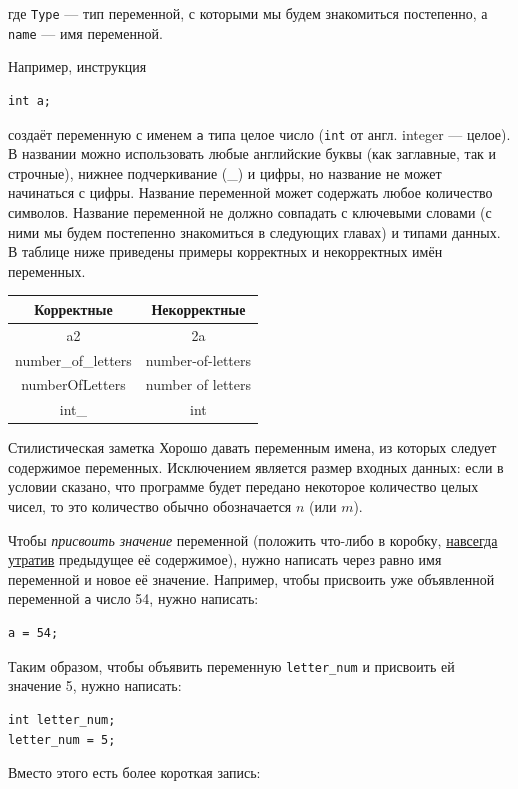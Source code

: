 \documentclass{article}
\newcommand{\tabularII}[1]{\begin{center}\begin{tabular}{|c|c|} #1 \end{tabular}\end{center}}
\newcommand{\style}[1]{
	\begin{sectionenv}[green!30!white]{Стилистическая заметка}
		#1
	\end{sectionenv}
}
\begin{document}
	где \texttt{Type} --- тип переменной, с которыми мы будем знакомиться постепенно, а \texttt{name} --- имя переменной.
	
	Например, инструкция
	
	\begin{lstlisting}
int a;
	\end{lstlisting}
	
	создаёт переменную с именем \texttt{a} типа целое число (\texttt{int} от англ. integer --- целое). В названии можно использовать любые английские буквы (как заглавные, так и строчные), нижнее подчеркивание (\_) и цифры, но название не может начинаться с цифры. Название переменной может содержать любое количество символов. Название переменной не должно совпадать с ключевыми словами (с ними мы будем постепенно знакомиться в следующих главах) и типами данных. В таблице ниже приведены примеры корректных и некорректных имён переменных.
	
	\tabularII{
		\hline
		\textbf{Корректные} & \textbf{Некорректные}\\
		\hline
		a2 & 2a\\
		\hline
		number\_of\_letters & number-of-letters\\
		\hline
		numberOfLetters & number of letters\\
		\hline
		int\_ & int\\
		\hline
	}
	
	\style{Хорошо давать переменным имена, из которых следует содержимое переменных. Исключением является размер входных данных: если в условии сказано, что программе будет передано некоторое количество целых чисел, то это количество обычно обозначается $n$ (или $m$).}
	
	Чтобы \textit{присвоить значение} переменной (положить что-либо в коробку, \underline{навсегда утратив} предыдущее её содержимое), нужно написать через равно имя переменной и новое её значение. Например, чтобы присвоить уже объявленной переменной \texttt{a} число 54, нужно написать:
	
	\begin{lstlisting}
a = 54;
	\end{lstlisting}
	
	Таким образом, чтобы объявить переменную \texttt{letter\_num} и присвоить ей значение 5, нужно написать:
	
	\begin{lstlisting}
int letter_num;
letter_num = 5;
	\end{lstlisting}
	
	Вместо этого есть более короткая запись:
	
\end{document}
